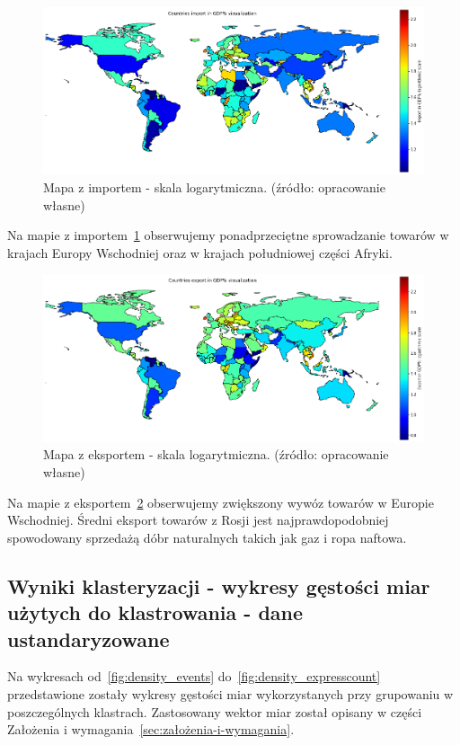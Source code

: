 \documentclass[11pt]{report}
\begin{document}
    \begin{figure}[!htp]
        \centering
        \includegraphics[width=\linewidth]{fig/CLUST/import2015.png}
        \caption{Mapa z importem - skala logarytmiczna. (źródło: opracowanie własne)}
        \label{fig:clustImport2015_log}
    \end{figure}
    Na mapie z importem~\ref{fig:clustImport2015_log} obserwujemy ponadprzeciętne sprowadzanie towarów w krajach Europy Wschodniej oraz w krajach południowej części Afryki.

    \begin{figure}[!htp]
        \centering
        \includegraphics[width=\linewidth]{fig/CLUST/export2015.png}
        \caption{Mapa z eksportem - skala logarytmiczna. (źródło: opracowanie własne)}
        \label{fig:clustExport2015_log}
    \end{figure}
    Na mapie z eksportem~\ref{fig:clustExport2015_log} obserwujemy zwiększony wywóz towarów w Europie Wschodniej.
    Średni eksport towarów z Rosji jest najprawdopodobniej spowodowany sprzedażą dóbr naturalnych takich jak gaz i ropa naftowa.

    \subsection{Wyniki klasteryzacji - wykresy gęstości miar użytych do klastrowania - dane ustandaryzowane}\label{subsec:wyniki-klasteryzacji---wykresy-gęstości-miar-użytych-do-klastrowania---dane-ustandaryzowane}
    Na wykresach od~\ref{fig:density_events} do~\ref{fig:density_expresscount} przedstawione zostały wykresy gęstości miar wykorzystanych przy grupowaniu w poszczególnych klastrach.
    Zastosowany wektor miar został opisany w części Założenia i wymagania~\ref{sec:założenia-i-wymagania}.
\end{document}
